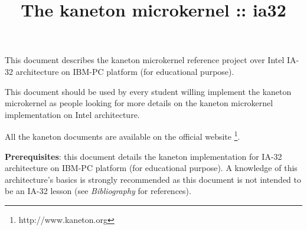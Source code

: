 %
%
%
%
%
%

%
%

%
%

\def\path{../../..}

%
%



%
%


%
%

\title{The kaneton microkernel :: ia32 \\
       \version
       \logo}

%
%



%
%

\maketitle

%
%

This document describes the kaneton microkernel reference project over
Intel IA-32 architecture on IBM-PC platform (for educational purpose).

\-

This document should be used by every student willing implement the
kaneton microkernel as people looking for more details on the kaneton
microkernel implementation on Intel architecture.

\-

All the kaneton documents are available on
the official website
  \footnote{http://www.kaneton.org}.

\-

\textbf{Prerequisites}: this document details the kaneton implementation
for IA-32 architecture on IBM-PC platform (for educational purpose). A
knowledge of this architecture's basics is strongly recommended as
this document is not intended to be an IA-32 lesson (see
\textit{Bibliography} for references).

%
%

\tableofcontents

%
%

\indentation{}

%
%













